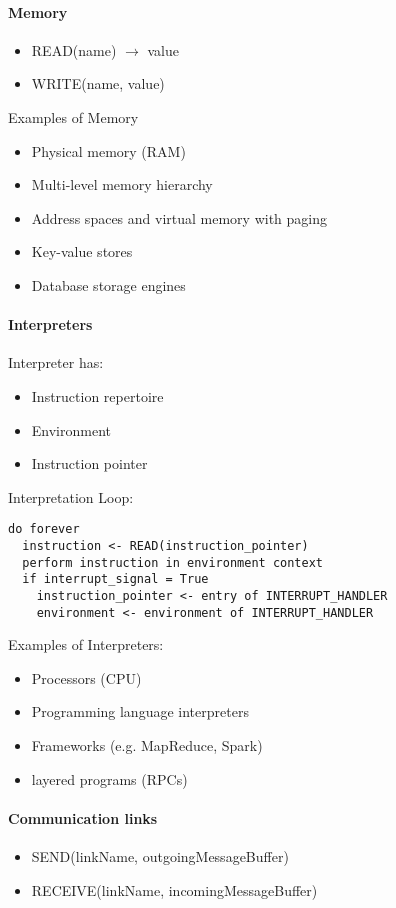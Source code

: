 \paragraph{Memory}
\begin{itemize}
\item READ(name) $\rightarrow$ value
\item WRITE(name, value)
\end{itemize}

Examples of Memory
\begin{itemize}
\item Physical memory (RAM)
\item Multi-level memory hierarchy
\item Address spaces and virtual memory with paging
\item Key-value stores
\item Database storage engines
\end{itemize}


\paragraph{Interpreters}
Interpreter has:
\begin{itemize}
\item Instruction repertoire
\item Environment
\item Instruction pointer
\end{itemize}

Interpretation Loop:

\begin{lstlisting}
do forever
  instruction <- READ(instruction_pointer)
  perform instruction in environment context
  if interrupt_signal = True
    instruction_pointer <- entry of INTERRUPT_HANDLER
    environment <- environment of INTERRUPT_HANDLER
\end{lstlisting}

Examples of Interpreters:
\begin{itemize}
\item Processors (CPU)
\item Programming language interpreters
\item Frameworks (e.g. MapReduce, Spark)
\item layered programs (RPCs)
\end{itemize}

\paragraph{Communication links}
\begin{itemize}
\item SEND(linkName, outgoingMessageBuffer)
\item RECEIVE(linkName, incomingMessageBuffer)
\end{itemize}


